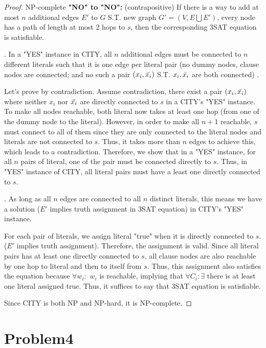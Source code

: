 \documentclass[openany]{article}
\begin{document}
\begin{proof}{NP-complete}
    \qquad \textbf{"NO" to "NO":} (contrapositive) If there is a way to add at most $n$ additional edges $E'$ to $G$ S.T. new graph $G'=(V,E\bigcup E')$, every node has a path of length at most 2 hops to $s$, then the corresponding 3SAT equation is satisfiable.

   . In a "YES" instance in CITY, all $n$ additional edges must be connected to $n$ different literals such that it is one edge per literal pair (no dummy nodes, clause nodes are connected; and no such a pair $(x_i, \Bar{x_i})$ S.T. $x_i, \Bar{x_i}$ are both connected) .

    \qquad Let's prove by contradiction. Assume contradiction, there exist a pair $(x_i, \Bar{x_i})$ where neither $x_i$ nor $\Bar{x_i}$ are directly connected to $s$ in a CITY's "YES" instance. To make all nodes reachable, both literal now takes at least one hop (from one of the dummy node to the literal). However, in order to make all $n+1$ reachable, $s$ must connect to all of them since they are only connected to the literal nodes and literals are not connected to $s$. Thus, it takes more than $n$ edges to achieve this, which leads to a contradiction. Therefore, we show that in a "YES" instance, for all $n$ pairs of literal, one of the pair must be connected directly to $s$. Thus, in "YES" instance of CITY, all literal pairs must have a least one directly connected to $s$.
    
    . As long as all $n$ edges are connected to all $n$ distinct literals, this means we have a solution ($E'$ implies truth assignment in 3SAT equation) in CITY's "YES" instance.

   \qquad For each pair of literals, we assign literal "true" when it is directly connected to $s$. ($E'$ implies truth assignment). Therefore, the assignment is valid. Since all literal pairs has at least one directly connected to $s$, all clause nodes are also reachable by one hop to literal and then to itself from $s$. Thus, this assignment also satisfies the equation because $\forall w_i:$ $w_i$ is reachable, implying that $\forall C_i: \exists$ there is at least one literal assigned true. Thus, it suffices to say that 3SAT equation is satisfiable.

    Since CITY is both NP and NP-hard, it is NP-complete.
    
   
\end{proof}


\section*{Problem4}
\end{document}
